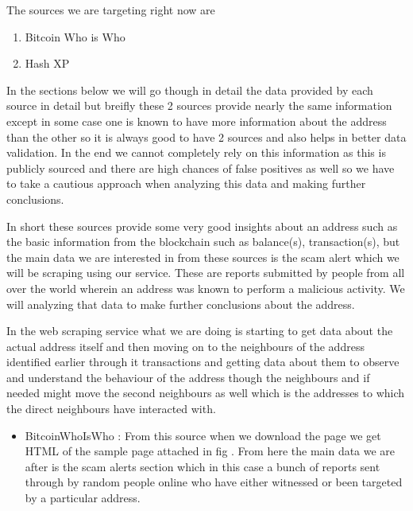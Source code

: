 \documentclass{article}
\begin{document}
        
        The sources we are targeting right now are 
        \begin{enumerate}
            \item Bitcoin Who is Who\cite{bitcoinwhoswho}
            \item Hash XP\cite{hashxp.org}
        \end{enumerate}
        In the sections below we will go though in detail the data provided by each source in detail but breifly these 2 sources provide nearly the same information except in some case one is known to have more information about the address than the other so it is always good to have 2 sources and also helps in better data validation. In the end we cannot completely rely on this information as this is publicly sourced and there are high chances of false positives as well so we have to take a cautious approach when analyzing this data and making further conclusions. 
        
        In short these sources provide some very good insights about an address such as the basic information from the blockchain such as balance(s), transaction(s), but the main data we are interested in from these sources is the scam alert which we will be scraping using our service. These are reports submitted by people from all over the world wherein an address was known to perform a malicious activity. We will analyzing that data to make further conclusions about the address.
        
        In the web scraping service what we are doing is starting to get data about the actual address itself and then moving on to the neighbours of the address identified earlier through it transactions and getting data about them to observe and understand the behaviour of the address though the neighbours and if needed might move the second neighbours as well which is the addresses to which the direct neighbours have interacted with.
        \begin{itemize}
            \item BitcoinWhoIsWho : From this source when we download the page we get HTML of the sample page attached in fig \cite{} . From here the main data we are after is the scam alerts section which in this case a bunch of reports sent through by random people online who have either witnessed or been targeted by a particular address. 
        \end{itemize}
        
\end{document}
